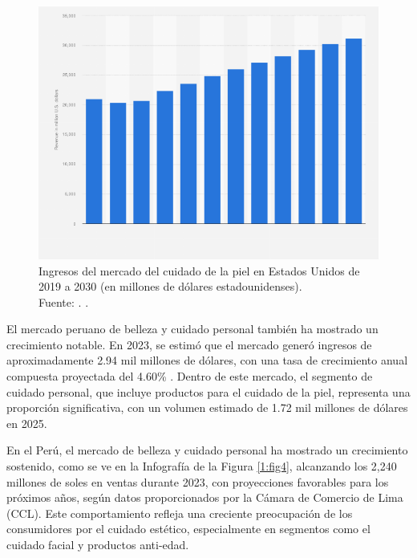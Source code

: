 \begin{figure}[!ht]
	\begin{center}
		\includegraphics[width=1\textwidth]{1/figures/cap1usa.png}
		\caption[Ingresos del mercado del cuidado de la piel en Estados Unidos de 2019 a 2030 (en millones de dólares estadounidenses)]{Ingresos del mercado del cuidado de la piel en Estados Unidos de 2019 a 2030 (en millones de dólares estadounidenses).\\
			Fuente: \cite{statista2023us}. .}
		\label{1:fig3}
	\end{center}
\end{figure}

El mercado peruano de belleza y cuidado personal también ha mostrado un crecimiento notable. En 2023, se estimó que el mercado generó ingresos de aproximadamente 2.94 mil millones de dólares, con una tasa de crecimiento anual compuesta proyectada del 4.60\% . Dentro de este mercado, el segmento de cuidado personal, que incluye productos para el cuidado de la piel, representa una proporción significativa, con un volumen estimado de 1.72 mil millones de dólares en 2025. \parencite{statista2023peru}

En el Perú, el mercado de belleza y cuidado personal ha mostrado un crecimiento sostenido, como se ve en la Infografía de la Figura \ref{1:fig4}, alcanzando los 2,240 millones de soles en ventas durante 2023, con proyecciones favorables para los próximos años, según datos proporcionados por la Cámara de Comercio de Lima (CCL). Este comportamiento refleja una creciente preocupación de los consumidores por el cuidado estético, especialmente en segmentos como el cuidado facial y productos anti-edad. \parencite{elperuano2025belleza}

